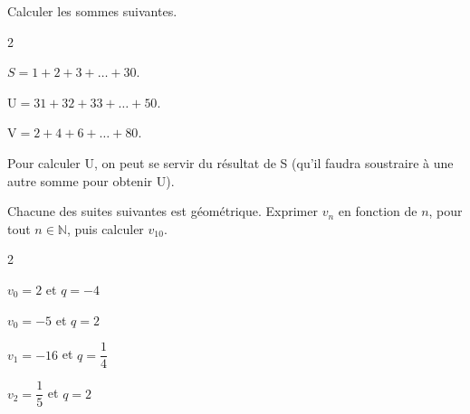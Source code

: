 \documentclass[12pt,a4paper]{article}  %
\begin{document}
%

\newpage


Calculer les sommes suivantes.
\begin{multicols}{2}
	\begin{enumMet}
		\item $S=1+2+3+\ldots+30$.
		\item $\mathrm{U}=31+32+33+\ldots+50$.
		\item $\mathrm{V}=2+4+6+\ldots+80$.
	\end{enumMet}
\end{multicols}

\begin{bidee}
	Pour calculer U, on peut se servir du résultat de S (qu'il faudra soustraire à une autre somme pour obtenir U).
\end{bidee}


Chacune des suites suivantes est géométrique. Exprimer $v_n$ en fonction de $n$, pour tout $n \in \mathbb{N}$, puis calculer $v_{10}$.
\begin{multicols}{2}
	\begin{enumMet}
		\item $v_0=2$ et $q=-4$
		\item $v_0=-5$ et $q=2$
		\item $v_1=-16$ et $q=\dfrac{1}{4}$
		\item {} $v_{2}=\dfrac{1}{5}$ et $q=2$
	\end{enumMet}
\end{multicols}
\end{document}
